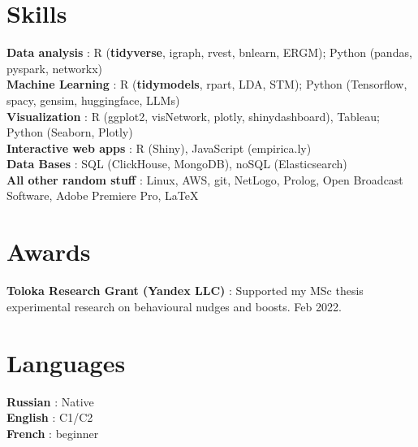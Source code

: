 \documentclass[letterpaper,11pt]{article}
\begin{document}
\section{Skills}
 \begin{itemize}[leftmargin=0in, label={}]
    \small{\item{
     \textbf{Data analysis} {: R (\textbf{tidyverse}, igraph, rvest, bnlearn, ERGM); Python (pandas, pyspark, networkx)} \vspace{2pt} \\
    \textbf{Machine Learning} {: R (\textbf{tidymodels}, rpart, LDA, STM); Python (Tensorflow, spacy, gensim, huggingface, LLMs)} \vspace{2pt} \\
    \textbf{Visualization} {: R (ggplot2, visNetwork, plotly, shinydashboard), Tableau;  Python (Seaborn, Plotly) } \vspace{2pt} \\
    \textbf{Interactive web apps} {: R (Shiny), JavaScript (empirica.ly)} \vspace{2pt} \\
    \textbf{Data Bases} {: SQL (ClickHouse, MongoDB), noSQL (Elasticsearch)} \vspace{2pt} \\
    \textbf{All other random stuff} {: Linux, AWS, git, NetLogo, Prolog, Open Broadcast Software, Adobe Premiere Pro, \LaTeX}
    }}
 \end{itemize}

\section{Awards}
 \begin{itemize}[leftmargin=0in, label={}]
    \small{\item{
     \textbf{Toloka Research Grant (Yandex LLC)} {: Supported my MSc thesis experimental research on behavioural nudges and boosts. Feb 2022.} \vspace{2pt} \\
    }}
 \end{itemize}

\section{Languages}
 \begin{itemize}[leftmargin=0in, label={}]
    \small{\item{
     \textbf{Russian} {: Native} \vspace{2pt} \\
     \textbf{English} {: C1/C2} \vspace{2pt} \\
     \textbf{French} {: beginner} \vspace{2pt} \\
    }}
 \end{itemize}
\end{document}
